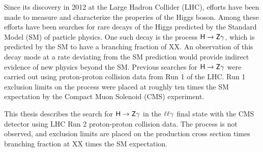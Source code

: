 \abstract
    
    Since its discovery in 2012 at the Large Hadron Collider (LHC), efforts have been made 
to measure and characterize the properies of the Higgs boson. Among these efforts have
been searches for rare decays of the Higgs predicted by the Standard Model (SM) of particle
physics. One such decay is the process $\sf H\rightarrow Z\gamma$, which is predicted
by the SM to have a branching fraction of XX. An observation 
of this decay mode at a rate deviating from the SM prediction would provide indirect 
evidence of new physics beyond the SM. Previous searches for $\sf H\rightarrow Z\gamma$ 
were carried out using proton-proton collision data from Run 1 of the LHC. Run 1 exclusion
limits on the process were placed at roughly ten times the SM expectation by 
the Compact Muon Solenoid (CMS) experiment. 

    This thesis describes the search for $\sf H\rightarrow Z\gamma$ in the $\sf \ell\ell\gamma$ 
final state with the CMS detector using LHC Run 2 proton-proton collision data. 
The process is not observed, and exclusion limits are placed on the production cross section 
times branching fraction at XX times the SM expectation.
